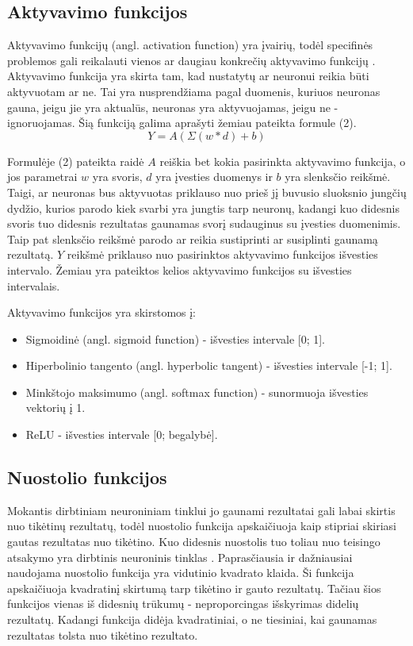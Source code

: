 \documentclass{VUMIFPSkursinis}
\begin{document}
\subsection{Aktyvavimo funkcijos}
Aktyvavimo funkcijų (angl. activation function) yra įvairių, todėl specifinės problemos gali reikalauti vienos ar daugiau konkrečių aktyvavimo funkcijų \cite{activation}.
Aktyvavimo funkcija yra skirta tam, kad nustatytų ar neuronui reikia būti aktyvuotam ar ne. Tai yra nusprendžiama pagal duomenis, kuriuos neuronas gauna, jeigu jie yra aktualūs, neuronas yra aktyvuojamas, jeigu ne - ignoruojamas.
Šią funkciją galima aprašyti žemiau pateikta formule (2).
\begin{equation}
Y = A(\Sigma{(w * d) + b})
\end{equation}

Formulėje (2) pateikta raidė \(A\) reiškia bet kokia pasirinkta aktyvavimo funkcija, o jos parametrai \(w\) yra svoris, \(d\) yra įvesties duomenys ir \(b\) yra slenksčio reikšmė. Taigi, ar neuronas bus aktyvuotas priklauso nuo prieš jį 
buvusio sluoksnio jungčių dydžio, kurios parodo kiek svarbi yra jungtis tarp neuronų, kadangi kuo didesnis svoris tuo didesnis rezultatas gaunamas svorį sudauginus su įvesties duomenimis. Taip pat slenksčio reikšmė parodo ar reikia 
sustiprinti ar susiplinti gaunamą rezultatą. \(Y\) reikšmė priklauso nuo pasirinktos aktyvavimo funkcijos išvesties intervalo. Žemiau yra pateiktos kelios aktyvavimo funkcijos su išvesties intervalais.  

Aktyvavimo funkcijos yra skirstomos į:
\begin{itemize}
\item Sigmoidinė (angl. sigmoid function) - išvesties intervale [0; 1].
\item Hiperbolinio tangento (angl. hyperbolic tangent) - išvesties intervale [-1; 1].
\item Minkštojo maksimumo (angl. softmax function) - sunormuoja išvesties vektorių į 1.
\item ReLU - išvesties intervale [0; begalybė].
\end{itemize}

\subsection{Nuostolio funkcijos}
Mokantis dirbtiniam neuroniniam tinklui jo gaunami rezultatai gali labai skirtis nuo tikėtinų rezultatų, todėl nuostolio funkcija apskaičiuoja kaip stipriai
skiriasi gautas rezultatas nuo tikėtino. Kuo didesnis nuostolis tuo toliau nuo teisingo atsakymo yra dirbtinis neuroninis tinklas \cite{Cameron-loss-fun}.
Paprasčiausia ir dažniausiai naudojama nuostolio funkcija yra vidutinio kvadrato klaida. Ši funkcija apskaičiuoja kvadratinį skirtumą tarp tikėtino 
ir gauto rezultatų. Tačiau šios funkcijos vienas iš didesnių trūkumų - neproporcingas išskyrimas didelių rezultatų. Kadangi funkcija didėja kvadratiniai,
o ne tiesiniai, kai gaunamas rezultatas tolsta nuo tikėtino rezultato.
\end{document}
